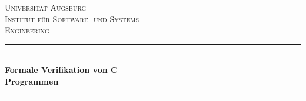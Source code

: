 \begin{titlepage} %
	\newcommand{\HRule}{\rule{\linewidth}{0.5mm}} %
	
	\center %
	
	
	\textsc{\LARGE Universität Augsburg}\\[1.5cm] %
	
	\textsc{\Large Institut für Software- und Systems\\[0.2cm] Engineering}\\[0.5cm] %
	
	
	
	\HRule\\[0.4cm]
	
	{\huge\bfseries Formale Verifikation von C\\[0.2cm] Programmen}\\[0.4cm] %
	
	\HRule\\[1.5cm]
	
	
	

\end{titlepage}
